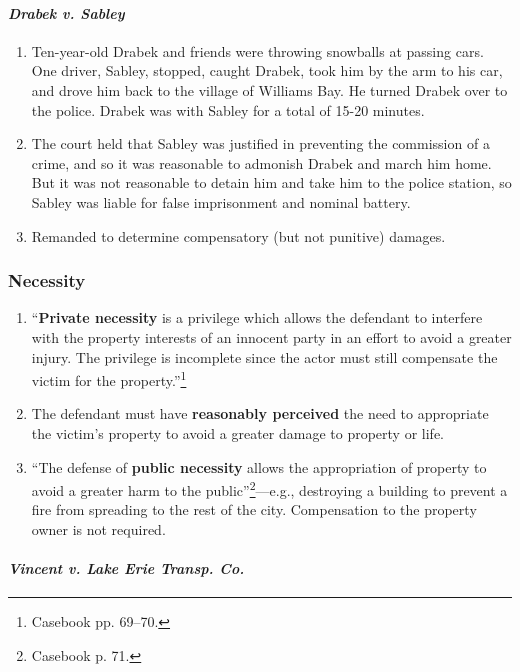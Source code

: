 \paragraph{\emph{Drabek v. Sabley}}

\begin{enumerate}
    \item Ten-year-old Drabek and friends were throwing snowballs at passing 
    cars. One driver, Sabley, stopped, caught Drabek, took him by the arm to 
    his car, and drove him back to the village of Williams Bay. He turned 
    Drabek over to the police. Drabek was with Sabley for a total of 15-20 
    minutes.
    \item The court held that Sabley was justified in preventing the 
    commission of a crime, and so it was reasonable to admonish Drabek and 
    march him home. But it was not reasonable to detain him and take him to 
    the police station, so Sabley was liable for false imprisonment and 
    nominal battery.
    \item Remanded to determine compensatory (but not punitive) damages.
\end{enumerate}

\subsubsection{Necessity}

\begin{enumerate}
    \item ``\textbf{Private necessity} is a privilege which allows the 
    defendant to interfere with the property interests of an innocent party in 
    an effort to avoid a greater injury. The privilege is incomplete since the 
    actor must still compensate the victim for the 
    property.''\footnote{Casebook pp.  69--70.}
    \item The defendant must have \textbf{reasonably perceived} the need to 
    appropriate the victim's property to avoid a greater damage to property or 
    life.
    \item ``The defense of \textbf{public necessity} allows the appropriation 
    of property to avoid a greater harm to the public''\footnote{Casebook p.  
    71.}---e.g., destroying a building to prevent a fire from spreading to the 
    rest of the city. Compensation to the property owner is not required.
\end{enumerate}

\paragraph{\emph{Vincent v. Lake Erie Transp. Co.}}

